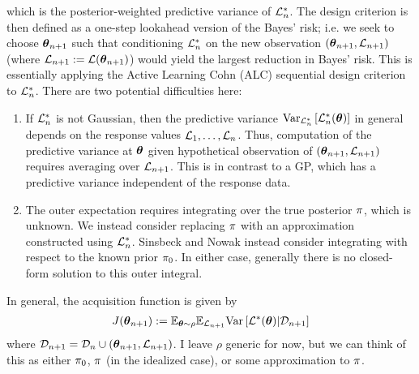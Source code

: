 \documentclass[12pt]{article}
\begin{document}
which is the posterior-weighted predictive variance of $\mathcal{L}_n^*$. The design criterion is then defined as a one-step lookahead version of the Bayes' risk; i.e. we seek to 
choose $\boldsymbol{\theta}_{n+1}$ such that conditioning $\mathcal{L}_n^*$ on the new observation $\left(\boldsymbol{\theta}_{n+1}, \mathcal{L}_{n+1} \right)$ 
(where $\mathcal{L}_{n+1} := \mathcal{L}(\boldsymbol{\theta}_{n+1})$) would yield the largest reduction in Bayes' risk. This is essentially applying the Active Learning Cohn (ALC) 
sequential design criterion to $\mathcal{L}_n^*$. There are two potential difficulties here: 
\begin{enumerate}
\item If $\mathcal{L}_n^*$ is not Gaussian, then the predictive variance $\mathrm{Var}_{\mathcal{L}_n^*}\left[\mathcal{L}_n^*(\boldsymbol{\theta}) \right]$ in general depends on the 
response values $\mathcal{L}_1, \dots, \mathcal{L}_n$. Thus, computation of the predictive variance at $\boldsymbol{\theta}$ given hypothetical observation of 
$\left(\boldsymbol{\theta}_{n+1}, \mathcal{L}_{n+1} \right)$ requires averaging over $\mathcal{L}_{n+1}$. This is in contrast to a GP, which has a predictive variance independent of 
the response data. 
\item The outer expectation requires integrating over the true posterior $\pi$, which is unknown. We instead consider replacing $\pi$ with an approximation constructed 
using $\mathcal{L}_n^*$. Sinsbeck and Nowak instead consider integrating with respect to the known 
prior $\pi_0$. In either case, generally there is no closed-form solution to this outer integral. 
\end{enumerate}
In general, the acquisition function is given by 
\begin{align}
J(\boldsymbol{\theta}_{n+1}) := \mathbb{E}_{\boldsymbol{\theta} \sim \rho} \mathbb{E}_{\mathcal{L}_{n+1}} \mathrm{Var}\left[\mathcal{L}^*(\boldsymbol{\theta}) | \mathcal{D}_{n+1} \right] \label{acquisition}
\end{align}
where $\mathcal{D}_{n+1} = \mathcal{D}_{n} \cup \left(\boldsymbol{\theta}_{n+1}, \mathcal{L}_{n+1} \right)$. I leave $\rho$ generic for now, but we can think of this as either 
$\pi_0$, $\pi$ (in the idealized case), or some approximation to $\pi$. 
\end{document}
